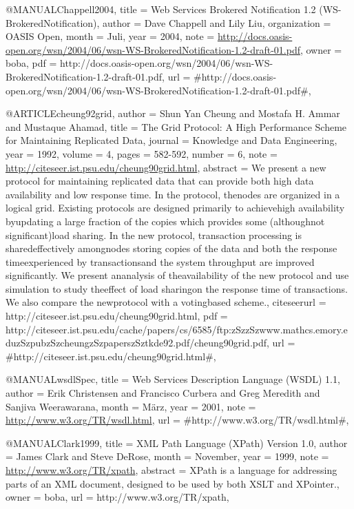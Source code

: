 @MANUAL{Chappell2004,
  title = {{Web Services Brokered Notification 1.2 (WS-BrokeredNotification)}},
  author = {Dave Chappell and Lily Liu},
  organization = {OASIS Open},
  month = {Juli},
  year = {2004},
  note = {\url{http://docs.oasis-open.org/wsn/2004/06/wsn-WS-BrokeredNotification-1.2-draft-01.pdf}},
  owner = {boba},
  pdf = {http://docs.oasis-open.org/wsn/2004/06/wsn-WS-BrokeredNotification-1.2-draft-01.pdf},
  url = {#http://docs.oasis-open.org/wsn/2004/06/wsn-WS-BrokeredNotification-1.2-draft-01.pdf#},
}

@ARTICLE{cheung92grid,
  author = {Shun Yan Cheung and Mostafa H. Ammar and Mustaque Ahamad},
  title = {{The Grid Protocol: A High Performance Scheme for Maintaining Replicated
	Data}},
  journal = {Knowledge and Data Engineering},
  year = {1992},
  volume = {4},
  pages = {582-592},
  number = {6},
  note = {\url{http://citeseer.ist.psu.edu/cheung90grid.html}},
  abstract = {We present a new protocol for maintaining replicated data that can
	provide both high data
availability and low response time. In the
	protocol, thenodes are
organized in a logical grid. Existing protocols
	are designed primarily to
achievehigh availability byupdating a large
	fraction of the copies
which provides some (althoughnot significant)load
	sharing. In the new
protocol, transaction processing is sharedeffectively
	amongnodes
storing copies of the data and both the response timeexperienced
	by
transactionsand the system throughput are improved significantly.
	We
present ananalysis of theavailability of the new protocol and
	use
simulation to study theeffect of load sharingon the response
	time of
transactions. We also compare the newprotocol with a votingbased
	scheme.},
  citeseerurl = {http://citeseer.ist.psu.edu/cheung90grid.html},
  pdf = {http://citeseer.ist.psu.edu/cache/papers/cs/6585/ftp:zSzzSzwww.mathcs.emory.eduzSzpubzSzcheungzSzpaperszSztkde92.pdf/cheung90grid.pdf},
  url = {#http://citeseer.ist.psu.edu/cheung90grid.html#},
}

@MANUAL{wsdlSpec,
  title = {{Web Services Description Language (WSDL) 1.1}},
  author = {Erik Christensen and Francisco Curbera and Greg Meredith and Sanjiva
	Weerawarana},
  month = {März},
  year = {2001},
  note = {\url{http://www.w3.org/TR/wsdl.html}},
  url = {#http://www.w3.org/TR/wsdl.html#},
}

@MANUAL{Clark1999,
  title = {{XML Path Language (XPath) Version 1.0}},
  author = {James Clark and Steve DeRose},
  month = {November},
  year = {1999},
  note = {\url{http://www.w3.org/TR/xpath}},
  abstract = {XPath is a language for addressing parts
of an XML document, designed
	to be used by both XSLT and XPointer.},
  owner = {boba},
  url = {http://www.w3.org/TR/xpath},
}

